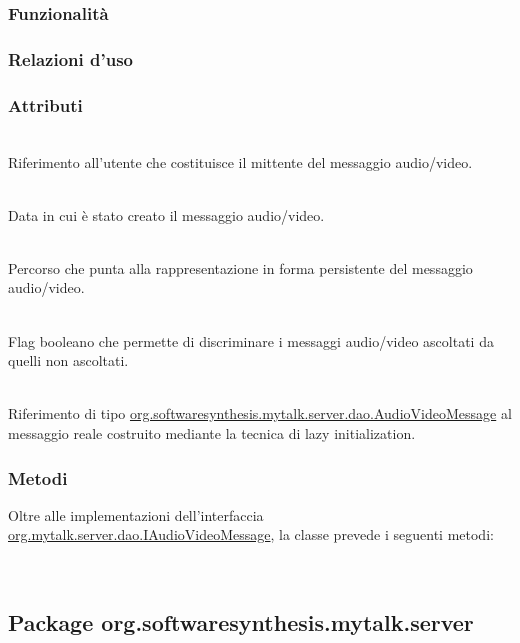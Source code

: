 \subsubsection*{Funzionalità}

\subsubsection*{Relazioni d'uso}

\subsubsection*{Attributi}
\begin{description}
  \item{}\\
Riferimento all'utente che costituisce il mittente del messaggio audio/video.
  \item{}\\
Data in cui è stato creato il messaggio audio/video.
  \item{}\\
Percorso che punta alla rappresentazione in forma persistente del messaggio audio/video.
  \item{}\\
Flag booleano che permette di discriminare i messaggi audio/video ascoltati da quelli non ascoltati.
  \item{}\\
Riferimento di tipo \hyperref[AudioVideoMessage]{\ttfamily{}org.softwaresynthesis.mytalk.server.dao.AudioVideoMessage} al messaggio reale costruito mediante la tecnica di lazy initialization.
\end{description}

\subsubsection*{Metodi}
Oltre alle implementazioni dell'interfaccia \hyperref[IAudioVideoMessage]{\ttfamily{}org.mytalk.server.dao.IAudioVideoMessage}, la classe prevede i seguenti metodi:
\begin{description}
\item{}\\
\end{description}

\subsection{Package org.softwaresynthesis.mytalk.server}\label{sec:server}

